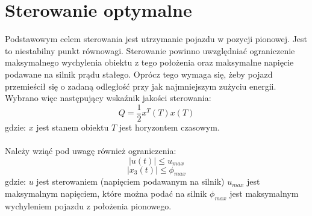 \section{Sterowanie optymalne}
\label{sec:sterowanie_optymalne}

Podstawowym celem sterowania jest utrzymanie pojazdu w pozycji pionowej. Jest to niestabilny punkt równowagi. Sterowanie powinno uwzględniać ograniczenie maksymalnego wychylenia obiektu z tego położenia oraz maksymalne napięcie podawane na silnik prądu stałego. Oprócz tego wymaga się, żeby pojazd przemieścił się o zadaną odległość przy jak najmniejszym zużyciu energii. Wybrano więc następujący wskaźnik jakości sterowania:
\begin{equation}
Q=\frac{1}{2}x^T(T)x(T)
\end{equation}
\noindent gdzie:\newline
\(x\) jest stanem obiektu\newline
\(T\) jest horyzontem czasowym.

\paragraph*{}
Należy wziąć pod uwagę również ograniczenia:
\begin{equation}
|u(t)|\leqslant u_{max}
\label{eq:u_max}
\end{equation}
\begin{equation}
|x_3(t)|\leqslant \phi_{max}
\label{eq:phi_max}
\end{equation}
\noindent gdzie:\newline
\(u\) jest sterowaniem (napięciem podawanym na silnik)\newline
\(u_{max}\) jest maksymalnym napięciem, które można podać na silnik\newline
\(\phi_{max}\) jest maksymalnym wychyleniem pojazdu z położenia pionowego.

